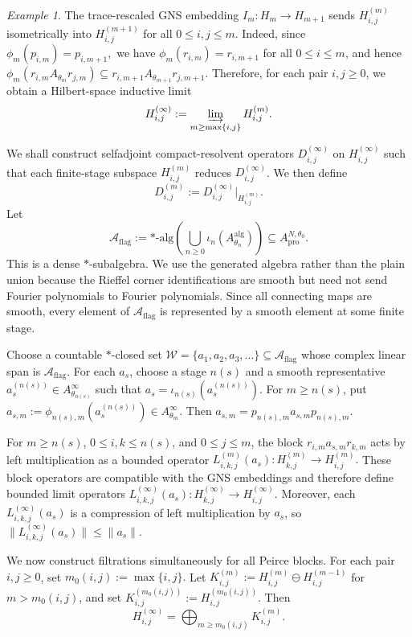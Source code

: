 \documentclass[11pt]{amsart}
\theoremstyle{definition}
\theoremstyle{remark}
\newtheorem{example}[theorem]{Example}
\newcommand{\ex}{\mathrm{pro}}
\begin{document}
\begin{example}
The trace-rescaled GNS embedding $I_m:H_m\to H_{m+1}$
sends $H_{i,j}^{(m)}$ isometrically into $H_{i,j}^{(m+1)}$ for all $0\le i,j\le m$.  Indeed, since
$\phi_m(p_{i,m})=p_{i,m+1},$ we have $\phi_m(r_{i,m})=r_{i,m+1}$ for all $0\leq i\leq m$, and hence $\phi_m(r_{i,m}A_{\theta_m}r_{j,m})
\subseteq
r_{i,m+1}A_{\theta_{m+1}}r_{j,m+1}.$
Therefore, for each pair $i,j\ge0$, we obtain a Hilbert-space inductive limit
\[
H_{i,j}^{(\infty)}
:=
\varinjlim_{m\ge \max\{i,j\}} H_{i,j}^{(m)}.
\]

We shall construct selfadjoint compact-resolvent operators $D_{i,j}^{(\infty)}$
on $H_{i,j}^{(\infty)}$ such that each finite-stage subspace \(H_{i,j}^{(m)}\) reduces
$D_{i,j}^{(\infty)}$. We then define
\[
D_{i,j}^{(m)}
:=
D_{i,j}^{(\infty)}\big|_{H_{i,j}^{(m)}}.
\]
Let
\[
\mathcal A_{\mathrm{flag}}
:=
*\text{-alg}\left(\bigcup_{n\geq0}\iota_n(A_{\theta_n}^{\mathrm{alg}})\right)
\subseteq A_{\ex}^{N,\theta_0}.
\]
This is a dense $*$-subalgebra. We use the generated algebra rather than the
plain union because the Rieffel corner identifications are smooth but need not
send Fourier polynomials to Fourier polynomials.  Since all connecting maps are
smooth, every element of $\mathcal A_{\mathrm{flag}}$ is represented by a
smooth element at some finite stage.

Choose a countable $*$-closed set $\mathcal W=\{a_1,a_2,a_3,\ldots\}\subseteq \mathcal A_{\mathrm{flag}}$
whose complex linear span is $\mathcal A_{\mathrm{flag}}$. For each $a_s$,
choose a stage $n(s)$ and a smooth representative $a_s^{(n(s))}\in A_{\theta_{n(s)}}^\infty$
such that $a_s=\iota_{n(s)}(a_s^{(n(s))}).$
For $m\geq n(s)$, put $a_{s,m}:=\phi_{n(s),m}(a_s^{(n(s))})\in A_{\theta_m}^\infty.$
Then $a_{s,m}=p_{n(s),m}a_{s,m}p_{n(s),m}.$

For $m\geq n(s)$, $0\leq i,k\leq n(s)$, and $0\leq j\leq m$, the block $r_{i,m}a_{s,m}r_{k,m}$
acts by left multiplication as a bounded operator $L_{i,k,j}^{(m)}(a_s):H_{k,j}^{(m)}
\longrightarrow H_{i,j}^{(m)}.$
These block operators are compatible with the GNS embeddings and therefore
define bounded limit operators $L_{i,k,j}^{(\infty)}(a_s):H_{k,j}^{(\infty)}\longrightarrow
H_{i,j}^{(\infty)}.$ Moreover, each $L_{i,k,j}^{(\infty)}(a_s)$ is a compression of left
multiplication by $a_s$, so $\|L_{i,k,j}^{(\infty)}(a_s)\|\leq \|a_s\|.$

We now construct filtrations simultaneously for all Peirce blocks. For each
pair $i,j\geq0$, set $m_0(i,j):=\max\{i,j\}.$
Let $K_{i,j}^{(m)}:=H_{i,j}^{(m)}\ominus H_{i,j}^{(m-1)}$ for
$m>m_0(i,j)$,
and set $K_{i,j}^{(m_0(i,j))}:=H_{i,j}^{(m_0(i,j))}.$
Then
\[
H_{i,j}^{(\infty)}
=
\bigoplus_{m\geq m_0(i,j)}K_{i,j}^{(m)}.
\]


\end{example}
\end{document}

